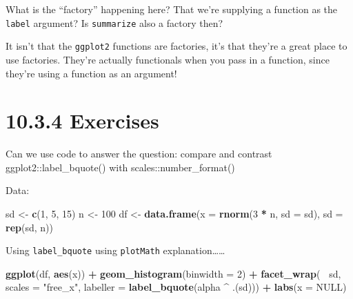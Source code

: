 \documentclass[]{book}
\newenvironment{Shaded}{\begin{snugshade}}{\end{snugshade}}
\newcommand{\DataTypeTok}[1]{\textcolor[rgb]{0.13,0.29,0.53}{#1}}
\newcommand{\DecValTok}[1]{\textcolor[rgb]{0.00,0.00,0.81}{#1}}
\newcommand{\KeywordTok}[1]{\textcolor[rgb]{0.13,0.29,0.53}{\textbf{#1}}}
\newcommand{\NormalTok}[1]{#1}
\newcommand{\OperatorTok}[1]{\textcolor[rgb]{0.81,0.36,0.00}{\textbf{#1}}}
\newcommand{\OtherTok}[1]{\textcolor[rgb]{0.56,0.35,0.01}{#1}}
\newcommand{\StringTok}[1]{\textcolor[rgb]{0.31,0.60,0.02}{#1}}
\begin{document}
What is the ``factory'' happening here? That we're supplying a function as the \texttt{label} argument? Is \texttt{summarize} also a factory then?

It isn't that the \texttt{ggplot2} functions are factories, it's that they're a great place to use factories. They're actually functionals when you pass in a function, since they're using a function as an argument!

\hypertarget{exercises-8}{%
\section*{10.3.4 Exercises}\label{exercises-8}}

Can we use code to answer the question: compare and contrast ggplot2::label\_bquote() with scales::number\_format()

Data:

\begin{Shaded}
\begin{Highlighting}[]
\NormalTok{sd <-}\StringTok{ }\KeywordTok{c}\NormalTok{(}\DecValTok{1}\NormalTok{, }\DecValTok{5}\NormalTok{, }\DecValTok{15}\NormalTok{)}
\NormalTok{n <-}\StringTok{ }\DecValTok{100}
\NormalTok{df <-}\StringTok{ }\KeywordTok{data.frame}\NormalTok{(}\DataTypeTok{x =} \KeywordTok{rnorm}\NormalTok{(}\DecValTok{3} \OperatorTok{*}\StringTok{ }\NormalTok{n, }\DataTypeTok{sd =}\NormalTok{ sd), }\DataTypeTok{sd =} \KeywordTok{rep}\NormalTok{(sd, n))}
\end{Highlighting}
\end{Shaded}

Using \texttt{label\_bquote} using \texttt{plotMath} explanation\ldots{}\ldots{}

\begin{Shaded}
\begin{Highlighting}[]
\KeywordTok{ggplot}\NormalTok{(df, }\KeywordTok{aes}\NormalTok{(x)) }\OperatorTok{+}\StringTok{ }
\StringTok{  }\KeywordTok{geom_histogram}\NormalTok{(}\DataTypeTok{binwidth =} \DecValTok{2}\NormalTok{) }\OperatorTok{+}\StringTok{ }
\StringTok{  }\KeywordTok{facet_wrap}\NormalTok{(}\OperatorTok{~}\StringTok{ }\NormalTok{sd, }\DataTypeTok{scales =} \StringTok{"free_x"}\NormalTok{, }\DataTypeTok{labeller =} \KeywordTok{label_bquote}\NormalTok{(alpha }\OperatorTok{^}\StringTok{ }\NormalTok{.(sd))) }\OperatorTok{+}\StringTok{ }
\StringTok{  }\KeywordTok{labs}\NormalTok{(}\DataTypeTok{x =} \OtherTok{NULL}\NormalTok{) }
\end{Highlighting}
\end{Shaded}
\end{document}
